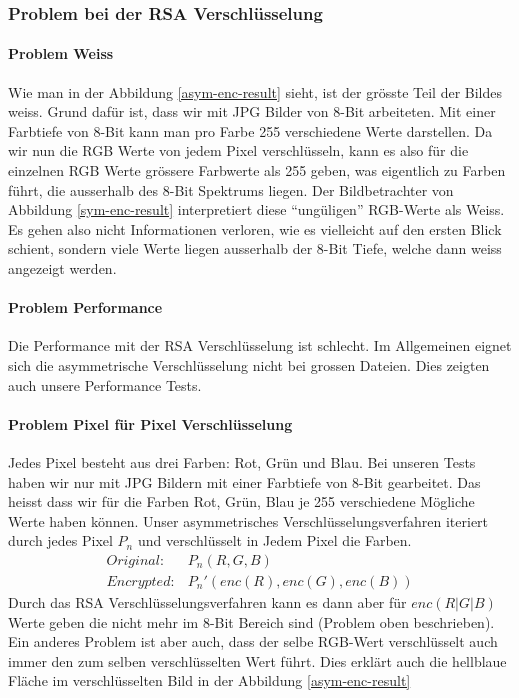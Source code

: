 \documentclass[paper=a4,fontsize=12pt]{scrartcl}
\begin{document}
\subsubsection{Problem bei der RSA Verschlüsselung} \label{problems-RSA}
\paragraph{Problem Weiss} \label{problem-white}
Wie man in der Abbildung \ref{asym-enc-result} sieht, ist der grösste Teil
der Bildes weiss.
Grund dafür ist, dass wir mit JPG Bilder von 8-Bit arbeiteten.
Mit einer Farbtiefe von 8-Bit kann man pro Farbe 255 verschiedene Werte darstellen.
Da wir nun die RGB Werte von jedem Pixel verschlüsseln, kann es also für die einzelnen
RGB Werte grössere Farbwerte als 255 geben, was eigentlich zu Farben führt,
die ausserhalb des 8-Bit Spektrums liegen.
Der Bildbetrachter von Abbildung \ref{sym-enc-result} interpretiert diese "`ungüligen"'
RGB-Werte als Weiss. 
Es gehen also nicht Informationen verloren, wie es vielleicht auf den ersten Blick schient,
sondern viele Werte liegen ausserhalb der 8-Bit Tiefe, welche dann weiss angezeigt werden.

\paragraph{Problem Performance} Die Performance mit der RSA Verschlüsselung ist schlecht.
Im Allgemeinen eignet sich die asymmetrische Verschlüsselung nicht bei grossen Dateien.
Dies zeigten auch unsere Performance Tests.

\paragraph{Problem Pixel für Pixel Verschlüsselung} 
Jedes Pixel besteht aus drei Farben: Rot, Grün und Blau.
Bei unseren Tests haben wir nur mit JPG Bildern mit einer Farbtiefe von 8-Bit gearbeitet.
Das heisst dass wir für die Farben Rot, Grün, Blau je 255 verschiedene Mögliche Werte haben können.
Unser asymmetrisches Verschlüsselungsverfahren iteriert durch jedes Pixel $P_n$ und verschlüsselt
in Jedem Pixel die Farben.
\begin{align} 
Original: &P_n(R,G,B) \\
Encrypted: &P_n'(enc(R), enc(G), enc(B))
\end{align}
Durch das RSA Verschlüsselungsverfahren kann es dann aber für $enc(R|G|B)$ Werte geben die nicht mehr
im 8-Bit Bereich sind (Problem oben beschrieben).
Ein anderes Problem ist aber auch, dass der selbe RGB-Wert verschlüsselt auch immer den zum selben
verschlüsselten Wert führt. Dies erklärt auch die hellblaue Fläche im verschlüsselten Bild 
in der Abbildung \ref{asym-enc-result}
\end{document}
